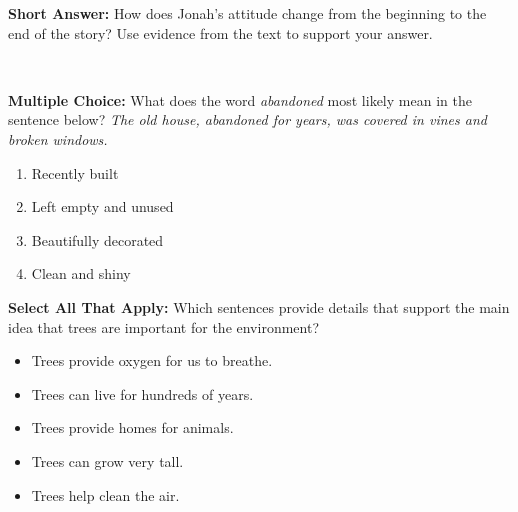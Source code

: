 \documentclass[12pt]{article}
\begin{document}
\begin{tcolorbox}[colframe=black!50, colback=white, title=Question 3]
\textbf{Short Answer:} How does Jonah’s attitude change from the beginning to the end of the story? Use evidence from the text to support your answer.  

\vspace{2em}
\underline{\hspace{15.8cm}}  
   \\[0.8cm] \underline{\hspace{15.8cm}}  
\end{tcolorbox}

\begin{tcolorbox}[colframe=black!50, colback=white, title=Question 4]
\textbf{Multiple Choice:} What does the word \textit{abandoned} most likely mean in the sentence below?  
\textit{The old house, abandoned for years, was covered in vines and broken windows.}  
\begin{enumerate}[label=(\Alph*)]
\item Recently built  
\item Left empty and unused  
\item Beautifully decorated  
\item Clean and shiny  
\end{enumerate}
\end{tcolorbox}

\begin{tcolorbox}[colframe=black!50, colback=white, title=Question 5]
\textbf{Select All That Apply:} Which sentences provide details that support the main idea that trees are important for the environment?  
\begin{itemize}
\item Trees provide oxygen for us to breathe.  
\item Trees can live for hundreds of years.  
\item Trees provide homes for animals.  
\item Trees can grow very tall.  
\item Trees help clean the air.  
\end{itemize}
\end{tcolorbox}
\end{document}
